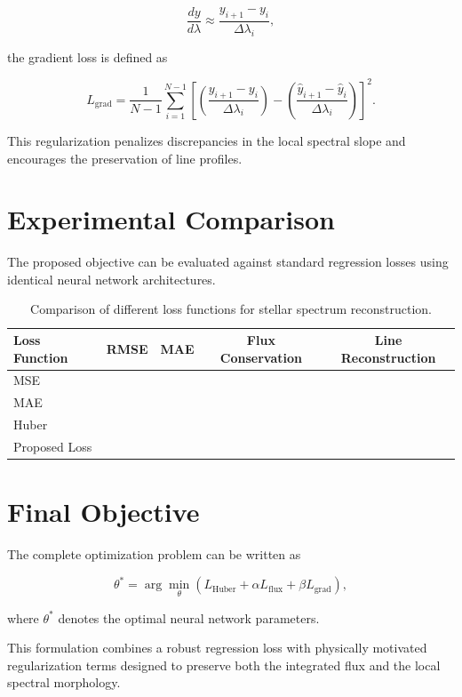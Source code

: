 \documentclass[11pt,a4paper]{article}
\begin{document}
\begin{equation}
\frac{dy}{d\lambda}
\approx
\frac{y_{i+1}-y_i}{\Delta\lambda_i},
\end{equation}

the gradient loss is defined as

\begin{equation}
L_{\mathrm{grad}}
=
\frac{1}{N-1}
\sum_{i=1}^{N-1}
\left[
\left(
\frac{y_{i+1}-y_i}{\Delta\lambda_i}
\right)
-
\left(
\frac{\hat{y}_{i+1}-\hat{y}_i}{\Delta\lambda_i}
\right)
\right]^2.
\end{equation}

This regularization penalizes discrepancies in the local spectral slope and encourages the preservation of line profiles.


\section{Experimental Comparison}

The proposed objective can be evaluated against standard regression losses using identical neural network architectures.

\begin{table}[h]
\centering
\begin{tabular}{lcccc}
\toprule
Loss Function &
RMSE &
MAE &
Flux Conservation &
Line Reconstruction \\
\midrule
MSE & & & & \\
MAE & & & & \\
Huber & & & & \\
Proposed Loss & & & & \\
\bottomrule
\end{tabular}
\caption{Comparison of different loss functions for stellar spectrum reconstruction.}
\end{table}



\section{Final Objective}

The complete optimization problem can be written as

\begin{equation}
\boxed{
\theta^{*}
=
\arg\min_{\theta}
\left(
L_{\mathrm{Huber}}
+
\alpha L_{\mathrm{flux}}
+
\beta L_{\mathrm{grad}}
\right),
}
\end{equation}

where $\theta^{*}$ denotes the optimal neural network parameters.

This formulation combines a robust regression loss with physically motivated regularization terms designed to preserve both the integrated flux and the local spectral morphology.
\end{document}
